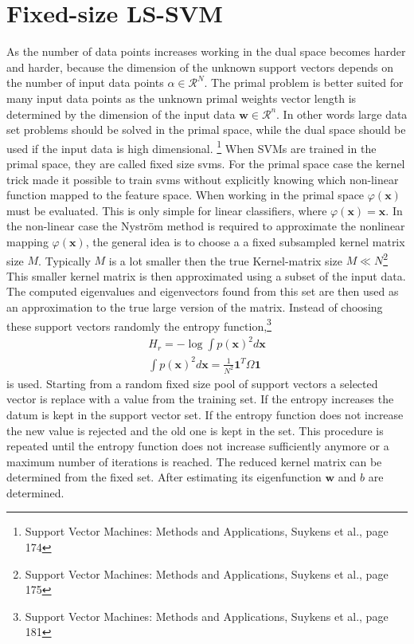 \section{Fixed-size LS-SVM}
As the number of data points increases working in the dual space becomes harder and harder, because the dimension of the unknown support vectors depends on the number of input data points $\alpha \in \mathcal{R}^N$. The primal problem is better suited for many input data points as the unknown primal weights vector length is determined by the dimension of the input data $\mathbf{w} \in \mathcal{R}^n$. In other words large data set problems should be solved in the primal space, while the dual space should be used if the input data is high dimensional. \footnote{Support Vector Machines: Methods and Applications, Suykens et al., page 174}
When SVMs are trained in the primal space, they are called fixed size svms. For the primal space case the kernel trick made it possible to train svms without explicitly knowing which non-linear function mapped to the feature space. When working in the primal space $\varphi(\mathbf{x})$ must be evaluated. This is only simple for linear classifiers, where $\varphi(\mathbf{x}) = \mathbf{x}$. In the non-linear case the Nystr\"{o}m method is required to approximate the nonlinear mapping $\varphi(\mathbf{x})$, the general idea is to choose a a fixed subsampled kernel matrix size $M$. Typically $M$ is a lot smaller then the true Kernel-matrix size $M \ll N$\footnote{Support Vector Machines: Methods and Applications, Suykens et al., page 175}  
This smaller kernel matrix is then approximated using a subset of the input data. The computed eigenvalues and eigenvectors found from this set are then used as an approximation to the true large version of the matrix. 
Instead of choosing these support vectors randomly the entropy function,\footnote{Support Vector Machines: Methods and Applications, Suykens et al., page 181} 
\begin{align}
H_r = - \log\int p(\mathbf{x})^2 d\mathbf{x} \\
\int p(\mathbf{x})^2 d\mathbf{x} = \frac{1}{N^2} \mathbf{1}^T \Omega \mathbf{1}
\end{align}
is used. Starting from a random fixed size pool of support vectors a selected vector is replace with a value from the training set. If the entropy increases the datum is kept in the support vector set. If the entropy function does not increase the new value is rejected and the old one is kept in the set. This procedure is repeated until the entropy function does not increase sufficiently anymore or a maximum number of iterations is reached. The reduced kernel matrix can be determined from the fixed set. After estimating its eigenfunction $\mathbf{w}$ and $b$ are determined.

